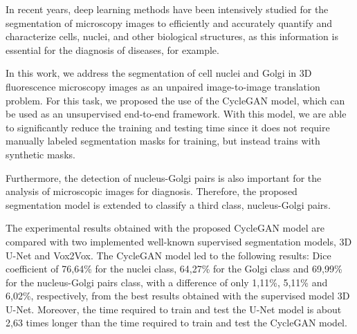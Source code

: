 \acresetall
\noindent In recent years, deep learning methods have been intensively studied for the segmentation of microscopy images to efficiently and accurately quantify and characterize cells, nuclei, and other biological structures, as this information is essential for the diagnosis of diseases, for example.

In this work, we address the segmentation of cell nuclei and Golgi in \ac{3D} fluorescence microscopy images as an unpaired image-to-image translation problem. For this task, we proposed the use of the CycleGAN model, which can be used as an unsupervised end-to-end framework. With this model, we are able to significantly reduce the training and testing time since it does not require manually labeled segmentation masks for training, but instead trains with synthetic masks.

Furthermore, the detection of nucleus-Golgi pairs is also important for the analysis of microscopic images for diagnosis. Therefore, the proposed segmentation model is extended to classify a third class, nucleus-Golgi pairs. 

The experimental results obtained with the proposed CycleGAN model are compared with two implemented well-known supervised segmentation models, \ac{3D} U-Net and Vox2Vox. The CycleGAN model led to the following results: Dice coefficient of 76,64\% for the nuclei class, 64,27\% for the Golgi class and 69,99\% for the nucleus-Golgi pairs class, with a difference of only 1,11\%, 5,11\% and 6,02\%, respectively, from the best results obtained with the supervised model \ac{3D} U-Net. Moreover, the time required to train and test the U-Net model is about 2,63 times longer than the time required to train and test the CycleGAN model.